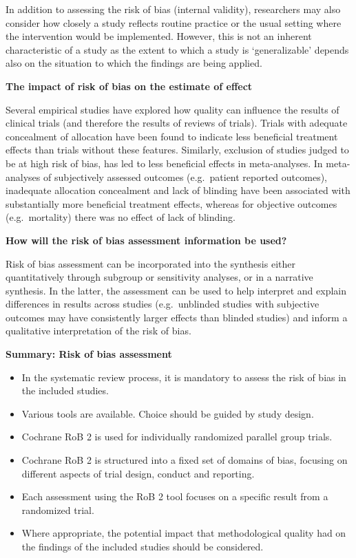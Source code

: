 \documentclass[
  11pt,
  a4paper,
  DIV=11,
  numbers=noendperiod]{scrreprt}
\begin{document}
In addition to assessing the risk of bias (internal validity),
researchers may also consider how closely a study reflects routine
practice or the usual setting where the intervention would be
implemented. However, this is not an inherent characteristic of a study
as the extent to which a study is `generalizable' depends also on the
situation to which the findings are being applied.

\textbf{The impact of risk of bias on the estimate of effect}

Several empirical studies have explored how quality can influence the
results of clinical trials (and therefore the results of reviews of
trials). Trials with adequate concealment of allocation have been found
to indicate less beneficial treatment effects than trials without these
features. Similarly, exclusion of studies judged to be at high risk of
bias, has led to less beneficial effects in meta-analyses. In
meta-analyses of subjectively assessed outcomes (e.g.~patient reported
outcomes), inadequate allocation concealment and lack of blinding have
been associated with substantially more beneficial treatment effects,
whereas for objective outcomes (e.g.~mortality) there was no effect of
lack of blinding.

\textbf{How will the risk of bias assessment information be used?}

Risk of bias assessment can be incorporated into the synthesis either
quantitatively through subgroup or sensitivity analyses, or in a
narrative synthesis. In the latter, the assessment can be used to help
interpret and explain differences in results across studies
(e.g.~unblinded studies with subjective outcomes may have consistently
larger effects than blinded studies) and inform a qualitative
interpretation of the risk of bias.

\textbf{Summary: Risk of bias assessment}

\begin{itemize}
\item
  In the systematic review process, it is mandatory to assess the risk
  of bias in the included studies.
\item
  Various tools are available. Choice should be guided by study design.
\item
  Cochrane RoB 2 is used for individually randomized parallel group
  trials.
\item
  Cochrane RoB 2 is structured into a fixed set of domains of bias,
  focusing on different aspects of trial design, conduct and reporting.
\item
  Each assessment using the RoB 2 tool focuses on a specific result from
  a randomized trial.
\item
  Where appropriate, the potential impact that methodological quality
  had on the findings of the included studies should be considered.
\end{itemize}
\end{document}

